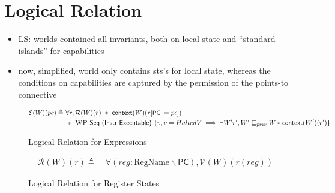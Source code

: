 \documentclass[sigplan,review]{acmart}\settopmatter{printfolios=true,printccs=false,printacmref=false}
\newcommand{\sep}{-\kern-.6em\raisebox{-.659ex}{*}\ }
\newcommand{\interp}[2]{(#1)(#2)}
\begin{document}
\section{Logical Relation}


\begin{itemize}
\item LS: worlds contained all invariants, both on local state and ``standard islands'' for capabilities
\item now, simplified, world only contains sts's for local state, whereas the conditions on capabilities are captured by the permission of the points-to connective
\end{itemize}



\begin{figure*}[ht]
	\begin{minipage}{\textwidth}
	\begin{align*}
		\mathcal{E}\interp{W}{pc} \triangleq&~\forall r, \mathcal{R}(W)(r) ~*~\textsf{context}(W)(r[\textsf{\small PC}:=pc])\\
		&\sep~\textsc{WP}~\textsf{Seq (Instr Executable)}~\{ v, v = HaltedV \implies \exists W' r', W' \sqsubseteq_{priv} W * \textsf{context}(W')(r')\}
	\end{align*}
	\end{minipage}
	\caption{Logical Relation for Expressions}
	\label{fig:expr}
\end{figure*}

\begin{figure*}[ht]
	\begin{minipage}{\textwidth}
	\begin{align*}
		\mathcal{R}\interp{W}{r} \triangleq&~\forall (reg : \text{RegName} \backslash \textsf{PC}), \mathcal{V}\interp{W}{r(reg)}
	\end{align*}
	\end{minipage}
	\caption{Logical Relation for Register States}
	\label{fig:regs}
\end{figure*}
\end{document}
